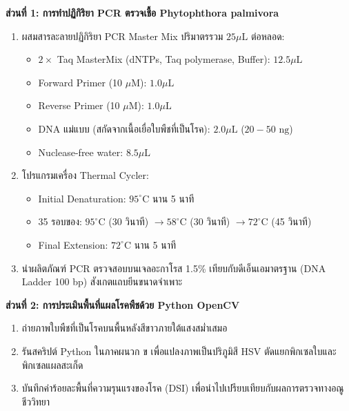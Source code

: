 \begin{labprotocol}
\textbf{ส่วนที่ 1: การทำปฏิกิริยา PCR ตรวจเชื้อ Phytophthora palmivora}
\begin{enumerate}
    \item ผสมสารละลายปฏิกิริยา PCR Master Mix ปริมาตรรวม $25\mu\text{L}$ ต่อหลอด:
    \begin{itemize}
        \item $2\times$ Taq MasterMix (dNTPs, Taq polymerase, Buffer): $12.5\mu\text{L}$
        \item Forward Primer (10 $\mu$M): $1.0\mu\text{L}$
        \item Reverse Primer (10 $\mu$M): $1.0\mu\text{L}$
        \item DNA แม่แบบ (สกัดจากเนื้อเยื่อใบพืชที่เป็นโรค): $2.0\mu\text{L}$ ($20-50\text{ ng}$)
        \item Nuclease-free water: $8.5\mu\text{L}$
    \end{itemize}
    \item โปรแกรมเครื่อง Thermal Cycler:
    \begin{itemize}
        \item Initial Denaturation: $95^\circ\text{C}$ นาน 5 นาที
        \item 35 รอบของ: $95^\circ\text{C}$ (30 วินาที) $\rightarrow 58^\circ\text{C}$ (30 วินาที) $\rightarrow 72^\circ\text{C}$ (45 วินาที)
        \item Final Extension: $72^\circ\text{C}$ นาน 5 นาที
    \end{itemize}
    \item นำผลิตภัณฑ์ PCR ตรวจสอบบนเจลอะกาโรส 1.5\% เทียบกับดีเอ็นเอมาตรฐาน (DNA Ladder 100 bp) สังเกตแถบยีนขนาดจำเพาะ
\end{enumerate}

\textbf{ส่วนที่ 2: การประเมินพื้นที่แผลโรคพืชด้วย Python OpenCV}
\begin{enumerate}
    \item ถ่ายภาพใบพืชที่เป็นโรคบนพื้นหลังสีขาวภายใต้แสงสม่ำเสมอ
    \item รันสคริปต์ Python ในภาคผนวก ข เพื่อแปลงภาพเป็นปริภูมิสี HSV ตัดแยกพิกเซลใบและพิกเซลแผลสะเก็ด
    \item บันทึกค่าร้อยละพื้นที่ความรุนแรงของโรค (DSI) เพื่อนำไปเปรียบเทียบกับผลการตรวจทางอณูชีววิทยา
\end{enumerate}
\end{labprotocol}

